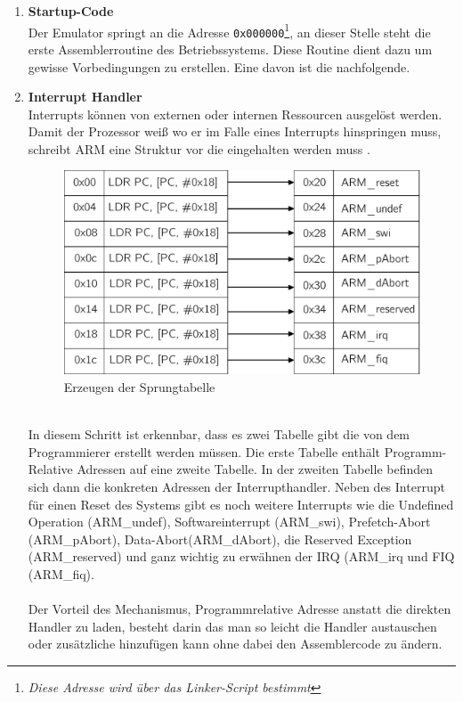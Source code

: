 	\begin{enumerate}
		\item{\textbf{Startup-Code}}\\
		 Der Emulator springt an die Adresse \texttt{0x000000}\footnote{\textit{Diese Adresse wird \"uber das Linker-Script bestimmt}}, an dieser Stelle steht die erste Assemblerroutine des Betriebssystems. Diese Routine dient dazu um gewisse Vorbedingungen zu erstellen. Eine davon ist die nachfolgende.
		 \item{\textbf{Interrupt Handler}}\\
		 \label{draft:exceptionHandler}
Interrupts k\"onnen von externen oder internen Ressourcen ausgel\"ost werden. Damit der Prozessor wei{\ss} wo er im Falle eines Interrupts hinspringen muss, schreibt ARM eine Struktur vor die eingehalten werden muss \parencite[vgl.][54]{archManI}. 
			\begin{figure}[h]
				\centering
					\includegraphics[scale=0.6]{common/exceptionhandler.pdf}
				\caption{Erzeugen der Sprungtabelle}
				\label{draft:excptionTable}
			\end{figure}\\
			In diesem Schritt ist erkennbar, dass es zwei Tabelle gibt die von dem Programmierer erstellt werden m\"ussen. Die erste Tabelle enth\"alt Programm-Relative Adressen auf eine zweite Tabelle. In der zweiten Tabelle befinden sich dann die konkreten Adressen der Interrupthandler. Neben des Interrupt f\"ur einen Reset des Systems gibt es noch weitere Interrupts wie die Undefined Operation (ARM\_undef), Softwareinterrupt (ARM\_swi), Prefetch-Abort (ARM\_pAbort), Data-Abort(ARM\_dAbort),  die Reserved Exception (ARM\_reserved) und ganz wichtig zu erw\"ahnen der IRQ (ARM\_irq und FIQ (ARM\_fiq).\\\\
Der Vorteil des Mechanismus, Programmrelative Adresse anstatt die direkten Handler zu laden, besteht darin das man so leicht die Handler austauschen oder zus\"atzliche hinzuf\"ugen kann ohne dabei den Assemblercode zu \"andern.\\

\end{enumerate}

